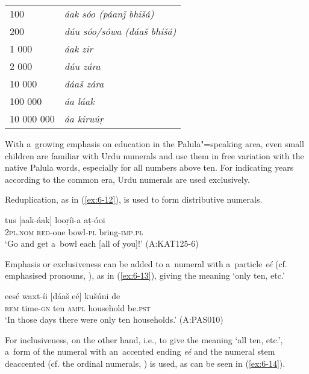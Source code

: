 {\begin{table}[H]
\begin{tabularx}{\textwidth}{ l@{\hspace{40pt}} Q }
100 &
\sffamily \textrm{\textit{áak sóo (páanǰ bhišá)}} \\
200 &
\sffamily \textrm{\textit{dúu sóo/sówa (dáaš bhišá)}}\\
1 000 &
\sffamily \textrm{\textit{áak zir}}\\
2 000 &
\sffamily \textrm{\textit{dúu zára}}\\
10 000 &
\sffamily \textrm{\textit{dáaš zára}}\\
100 000 &
\sffamily \textrm{\textit{áa láak}}\\
10 000 000 &
\sffamily \textrm{\textit{áa kiruúṛ}}\\
\end{tabularx}
\end{table}

With a~growing emphasis on education in the Palula"=speaking area, even small children are familiar
with Urdu numerals and use them in free variation with the native Palula words, especially for all
numbers above ten. For indicating years according to the common era, Urdu numerals are used
exclusively.

Reduplication, as in (\ref{ex:6-12}), is used to form distributive numerals.

\begin{exe}
\ex
\label{ex:6-12}
\gll tus [aak-áak] looṛíi-a aṭ-óoi \\
\textsc{2pl.nom} \textsc{red}-one bowl-\textsc{pl} bring-\textsc{imp.pl} \\
\glt `Go and get a~bowl each [all of you]!' (A:KAT125-6)
\end{exe}

Emphasis or exclusiveness can be added to a~numeral with a~particle \textit{eé} (cf. emphasised pronouns, ), as in (\ref{ex:6-13}), giving the meaning `only ten, etc.'

\begin{exe}
\ex
\label{ex:6-13}
\gll eesé waxt-íi [dáaš eé] kušúni de \\
\textsc{rem} time-\textsc{gn} ten \textsc{ampl} household be.\textsc{pst} \\
\glt `In those days there were only ten households.' (A:PAS010)
\end{exe}

For inclusiveness, on the other hand, i.e., to give the meaning `all ten, etc.', a~form of the numeral with an~accented ending \textit{eé} and the numeral stem deaccented (cf. the ordinal numerals, ) is used, as can be seen in (\ref{ex:6-14}).

}

